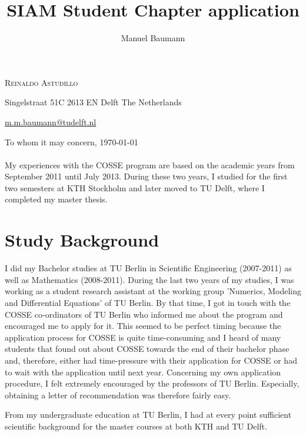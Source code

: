 \documentclass{article}
\title{\bf SIAM Student Chapter application }
\author{Manuel Baumann}
\begin{document}
\hfill \textsc{Reinaldo Astudillo}

\hfill Singelstraat 51C
\hfill 2613 EN Delft
\hfill The Netherlands
\hfill

\hfill \href{mailto:m.m.baumann@tudelft.nl}{m.m.baumann@tudelft.nl}


\vspace{2cm}

To whom it may concern, \hfill \today
\\ \\
My experiences with the COSSE program are based on the academic years from September 2011 until July 2013. During these two years, I studied for the first two semesters at KTH Stockholm and later moved to TU Delft, where I completed my master thesis.
\section*{Study Background}
I did my Bachelor studies at TU Berlin in Scientific Engineering (2007-2011) as well as Mathematics (2008-2011). During the last two years of my studies, I was working as a student research assistant at the working group 'Numerics, Modeling and Differential Equations' of TU Berlin. By that time, I got in touch with the COSSE co-ordinators of TU Berlin who informed me about the program and encouraged me to apply for it. This seemed to be perfect timing because the application process for COSSE is quite time-consuming and I heard of many students that found out about COSSE towards the end of their bachelor phase and, therefore, either had time-pressure with their application for COSSE or had to wait with the application until next year. Concerning my own application procedure, I felt extremely encouraged by the professors of TU Berlin. Especially, obtaining a letter of recommendation was therefore fairly easy.

From my undergraduate education at TU Berlin, I had at every point sufficient scientific background for the master courses at both KTH and TU Delft.
\end{document}
